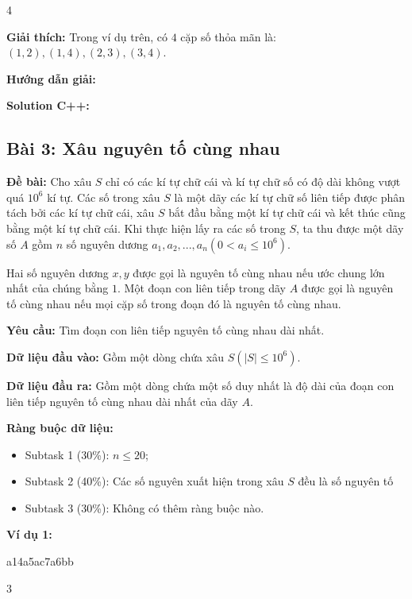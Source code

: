 \documentclass[12pt]{scrartcl}  %
\begin{document}
\begin{tcolorbox}[colback=gray!5!white, colframe=green!50!black, title=Output]
4
\end{tcolorbox}

\textbf{Giải thích:}
Trong ví dụ trên, có $4$ cặp số thỏa mãn là: $(1, 2), (1, 4), (2, 3), (3, 4)$.

\textbf{Hướng dẫn giải:}

\textbf{Solution C++:}

\subsection{Bài 3: Xâu nguyên tố cùng nhau}
\textbf{Đề bài:}
Cho xâu $S$ chỉ có các kí tự chữ cái và kí tự chữ số có độ dài không vượt quá $10^6$ kí tự. Các số trong xâu $S$ 
là một dãy các kí tự chữ số liên tiếp được phân tách bởi các kí tự chữ cái, xâu $S$ bắt đầu bằng một kí tự chữ cái và kết thúc cũng bằng 
một kí tự chữ cái. Khi thực hiện lấy ra các số trong $S$, ta thu được một dãy số $A$ gồm $n$ số nguyên dương $a_1, a_2, ..., a_n (0 < a_i \leq 10^6)$.

Hai số nguyên dương $x, y$ được gọi là nguyên tố cùng nhau nếu ước chung lớn nhất của chúng bằng $1$. Một đoạn con liên tiếp trong dãy $A$ được gọi là nguyên tố 
cùng nhau nếu mọi cặp số trong đoạn đó là nguyên tố cùng nhau.

\textbf{Yêu cầu:}
Tìm đoạn con liên tiếp nguyên tố cùng nhau dài nhất.

\textbf{Dữ liệu đầu vào:}
Gồm một dòng chứa xâu $S (|S| \leq 10^6)$.

\textbf{Dữ liệu đầu ra:}
Gồm một dòng chứa một số duy nhất là độ dài của đoạn con liên tiếp nguyên tố cùng nhau dài nhất của dãy $A$.

\textbf{Ràng buộc dữ liệu:}
\begin{itemize}
    \item Subtask 1 (30\%): $n \leq 20$;
    \item Subtask 2 (40\%): Các số nguyên xuất hiện trong xâu $S$ đều là số nguyên tố
    \item Subtask 3 (30\%): Không có thêm ràng buộc nào.
\end{itemize}

\textbf{Ví dụ 1:}

\begin{tcolorbox}[colback=gray!5!white, colframe=blue!50!black, title=Input]
a14a5ac7a6bb
\end{tcolorbox}
\begin{tcolorbox}[colback=gray!5!white, colframe=green!50!black, title=Output]
3
\end{tcolorbox}
\end{document}
